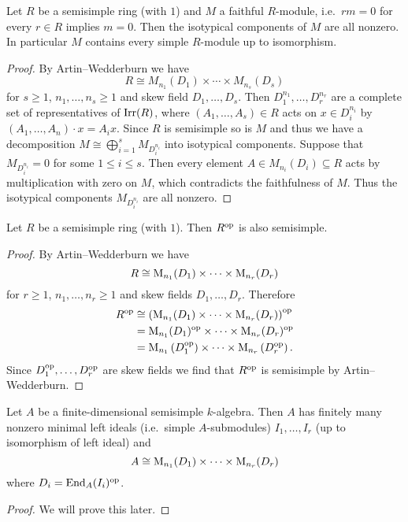 \begin{corollary}
  Let $R$ be a semisimple ring (with $1$) and $M$ a faithful $R$-module, i.e.\ $rm = 0$ for every $r \in R$ implies $m = 0$.
  Then the isotypical components of $M$ are all nonzero.
  In particular $M$ contains every simple $R$-module up to isomorphism.
\end{corollary}
\begin{proof}
  By Artin--Wedderburn we have
  \[
    R \cong M_{n_1}(D_1) \times \dotsb \times M_{n_s}(D_s)
  \]
  for $s \geq 1$, $n_1, \dotsc, n_s \geq 1$ and skew field $D_1, \dotsc, D_s$.
  Then $D_1^{n_1}, \dotsc, D_r^{n_r}$ are a complete set of representatives of $\operatorname{Irr}(R)$, where $(A_1, \dotsc, A_s) \in R$ acts on $x \in D_i^{n_i}$ by $(A_1, \dotsc, A_n) \cdot x = A_i x$.
  Since $R$ is semisimple so is $M$ and thus we have a decomposition $M \cong \bigoplus_{i=1}^s M_{D_i^{n_i}}$ into isotypical components.
  Suppose that $M_{D_i^{n_i}} = 0$ for some $1 \leq i \leq s$.
  Then every element $A \in M_{n_i}(D_i) \subseteq R$ acts by multiplication with zero on $M$, which contradicts the faithfulness of $M$.
  Thus the isotypical components $M_{D_i^{n_i}}$ are all nonzero.
\end{proof}




\begin{corollary}
  Let $R$ be a semisimple ring (with $1$).
  Then $R^{\mathrm{op}}$ is also semisimple.
\end{corollary}
\begin{proof}
  By Artin--Wedderburn we have
  \[
    R \cong \operatorname{M}_{n_1}(D_1) \times \dotsm \times \operatorname{M}_{n_r}(D_r)
  \]
  for $r \geq 1$, $n_1, \dotsc, n_r \geq 1$ and skew fields $D_1, \dotsc, D_r$.
  Therefore
  \begin{align*}
            R^{\mathrm{op}}
    &\cong  \left( \operatorname{M}_{n_1}(D_1) \times \dotsm \times \operatorname{M}_{n_r}(D_r) \right)^{\mathrm{op}} \\
    &=      \operatorname{M}_{n_1}(D_1)^{\mathrm{op}} \times \dotsm \times \operatorname{M}_{n_r}(D_r)^{\mathrm{op}} \\
    &=      \operatorname{M}_{n_1}\left( D_1^{\mathrm{op}} \right) \times \dotsm \times \operatorname{M}_{n_r}\left( D_r^{\mathrm{op}} \right).
  \end{align*}
  Since $D_1^{\mathrm{op}}, \dotsc, D_r^{\mathrm{op}}$ are skew fields we find that $R^{\mathrm{op}}$ is semisimple by Artin--Wedderburn.
\end{proof}


\begin{corollary}
  Let $A$ be a finite-dimensional semisimple $k$-algebra.
  Then $A$ has finitely many nonzero minimal left ideals (i.e.\ simple $A$-submodules) $I_1, \dotsc, I_r$ (up to isomorphism of left ideal) and
  \[
    A \cong \operatorname{M}_{n_1}(D_1) \times \dotsm \times \operatorname{M}_{n_r}(D_r)
  \]
  where $D_i = \operatorname{End}_A(I_i)^{\mathrm{op}}$.
\end{corollary}
\begin{proof}
  We will prove this later.
\end{proof}


